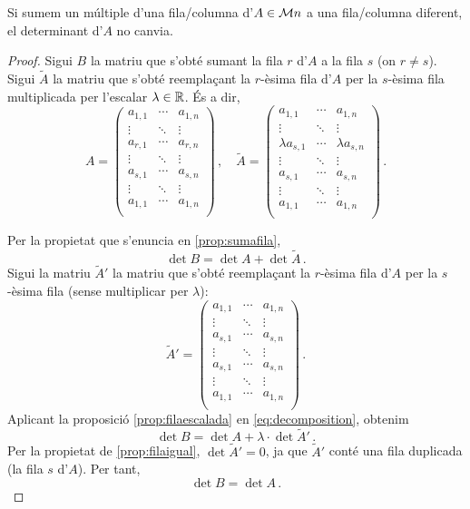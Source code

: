 \begin{prop}
	Si sumem un múltiple d'una fila/columna d'$A\in\mathcal{M}{n}$ a una fila/columna diferent, el determinant d'$A$ no canvia.
	\begin{proof}
		Sigui $B$ la matriu que s'obté sumant la fila $r$ d'$A$ a la fila $s$ (on $r\ne s$). Sigui $\tilde{A}$ la matriu que s'obté reemplaçant la $r$-èsima fila d'$A$ per la $s$-èsima fila multiplicada per l'escalar $\lambda \in\mathbb{R}$. És a dir,
		\[
		A = 
		\begin{pmatrix}
		a_{1,1}&	\cdots&		a_{1,n}\\
		\vdots&		\ddots&		\vdots\\
		a_{r,1}&	\cdots&		a_{r,n}\\
		\vdots&		\ddots&		\vdots\\
		a_{s,1}&	\cdots&		a_{s,n}\\
		\vdots&		\ddots&		\vdots\\
		a_{1,1}&	\cdots&		a_{1,n}\\
		\end{pmatrix}\,,
		\quad
		\tilde{A} = 
		\begin{pmatrix}
		a_{1,1}&	\cdots&		a_{1,n}\\
		\vdots&		\ddots&		\vdots\\
		\lambda a_{s,1}&	\cdots&		\lambda a_{s,n}\\
		\vdots&		\ddots&		\vdots\\
		a_{s,1}&	\cdots&		a_{s,n}\\
		\vdots&		\ddots&		\vdots\\
		a_{1,1}&	\cdots&		a_{1,n}\\
		\end{pmatrix}\,.
		\]
		
		Per la propietat que s'enuncia en \ref{prop:sumafila}, 
		\begin{equation}\label{eq:decomposition}
			\det B = \det A + \det \tilde{A}\,. 
		\end{equation}
		Sigui la matriu $\tilde{A}'$ la matriu que s'obté reemplaçant la $r$-èsima fila d'$A$ per la $s$-èsima fila (sense multiplicar per $\lambda $): 
		\[\tilde{A}' = 
		\begin{pmatrix}
		a_{1,1}&	\cdots&		a_{1,n}\\
		\vdots&		\ddots&		\vdots\\
		a_{s,1}&	\cdots&		a_{s,n}\\
		\vdots&		\ddots&		\vdots\\
		a_{s,1}&	\cdots&		a_{s,n}\\
		\vdots&		\ddots&		\vdots\\
		a_{1,1}&	\cdots&		a_{1,n}\\
		\end{pmatrix}\,.\]
		Aplicant la proposició \ref{prop:filaescalada} en \eqref{eq:decomposition}, obtenim \[\det B = \det A + \lambda \cdot\det \tilde{A}'\,.\] Per la propietat de \ref{prop:filaigual}, $\det \tilde{A}' = 0$, ja que $\tilde{A}'$ conté una fila duplicada (la fila $s$ d'$A$). Per tant, \[\det B=\det A\,. \]
	\end{proof}	
\end{prop}
